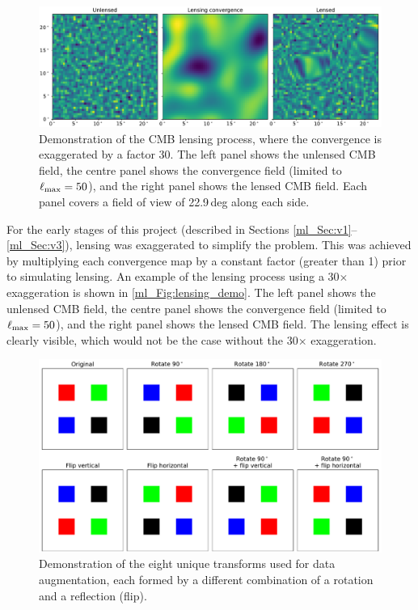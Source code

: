 \begin{figure}[tp]
\includegraphics[width=\textwidth]{lensing_demo}
\caption{Demonstration of the CMB lensing process, where the convergence is exaggerated by a factor 30. The left panel shows the unlensed CMB field, the centre panel shows the convergence field (limited to $\ell_\text{max} = 50$), and the right panel shows the lensed CMB field. Each panel covers a field of view of 22.9\,deg along each side.}
\label{ml_Fig:lensing_demo}
\end{figure}

For the early stages of this project (described in Sections \ref{ml_Sec:v1}--\ref{ml_Sec:v3}), lensing was exaggerated to simplify the problem. This was achieved by multiplying each convergence map by a constant factor (greater than 1) prior to simulating lensing. An example of the lensing process using a 30$\times$ exaggeration is shown in \autoref{ml_Fig:lensing_demo}. The left panel shows the unlensed CMB field, the centre panel shows the convergence field (limited to $\ell_\text{max} = 50$), and the right panel shows the lensed CMB field. The lensing effect is clearly visible, which would not be the case without the 30$\times$ exaggeration.

\begin{figure}[tp]
\includegraphics[width=\textwidth]{augmentation_demo}
\caption{Demonstration of the eight unique transforms used for data augmentation, each formed by a different combination of a rotation and a reflection (flip).}
\label{ml_Fig:augmentation_demo}
\end{figure}

